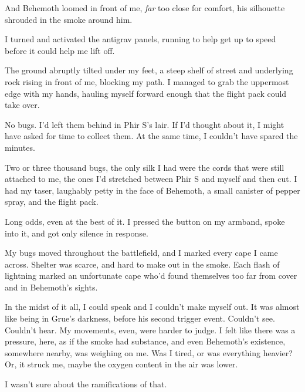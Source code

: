 And Behemoth loomed in front of me, \emph{far} too close for comfort, his silhouette shrouded in the smoke around him.



I turned and activated the antigrav panels, running to help get up to speed before it could help me lift off.  



The ground abruptly tilted under my feet, a steep shelf of street and underlying rock rising in front of me, blocking my path.  I managed to grab the uppermost edge with my hands, hauling myself forward enough that the flight pack could take over.



No bugs.  I'd left them behind in Phir S's lair.  If I'd thought about it, I might have asked for time to collect them.  At the same time, I couldn't have spared the minutes.



Two or three thousand bugs, the only silk I had were the cords that were still attached to me, the ones I'd stretched between Phir S and myself and then cut.  I had my taser, laughably petty in the face of Behemoth, a small canister of pepper spray, and the flight pack.



Long odds, even at the best of it.  I pressed the button on my armband, spoke into it, and got only silence in response.



My bugs moved throughout the battlefield, and I marked every cape I came across.  Shelter was scarce, and hard to make out in the smoke.  Each flash of lightning marked an unfortunate cape who'd found themselves too far from cover and in Behemoth's sights.



In the midst of it all, I could speak and I couldn't make myself out.  It was almost like being in Grue's darkness, before his second trigger event.  Couldn't see.  Couldn't hear.  My movements, even, were harder to judge.  I felt like there was a pressure, here, as if the smoke had substance, and even Behemoth's existence, somewhere nearby, was weighing on me.  Was I tired, or was everything heavier?  Or, it struck me, maybe the oxygen content in the air was lower.



I wasn't sure about the ramifications of that.



